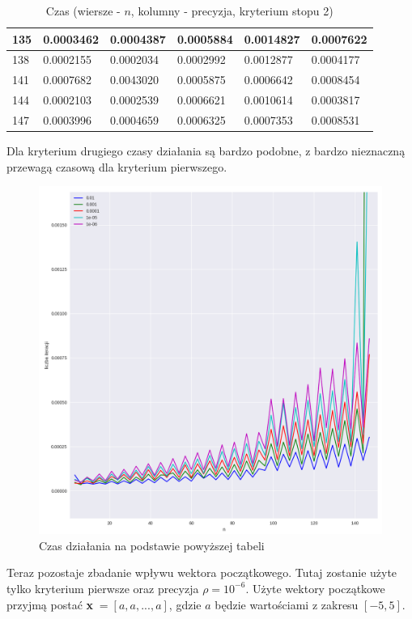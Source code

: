 \documentclass{article}
\begin{document}
\begin{table}[H]
\begin{tabular}{|l|l|l|l|l|l|}
135 & 0.0003462 & 0.0004387 & 0.0005884 & 0.0014827 & 0.0007622 \\ \hline
138 & 0.0002155 & 0.0002034 & 0.0002992 & 0.0012877 & 0.0004177 \\ \hline
141 & 0.0007682 & 0.0043020 & 0.0005875 & 0.0006642 & 0.0008454 \\ \hline
144 & 0.0002103 & 0.0002539 & 0.0006621 & 0.0010614 & 0.0003817 \\ \hline
147 & 0.0003996 & 0.0004659 & 0.0006325 & 0.0007353 & 0.0008531 \\ \hline
\end{tabular}
\caption{Czas (wiersze - $n$, kolumny - precyzja, kryterium stopu 2)}
\end{table}

Dla kryterium drugiego czasy działania są bardzo podobne, z bardzo nieznaczną przewagą czasową dla kryterium pierwszego.

\begin{figure}[H]
    \centering
    \includegraphics[width=\textwidth]{img/plot_6.png}
    \caption{Czas działania na podstawie powyższej tabeli}
\end{figure}

Teraz pozostaje zbadanie wpływu wektora początkowego. Tutaj zostanie użyte tylko kryterium pierwsze oraz precyzja $\rho=10^{-6}$. Użyte wektory
początkowe przyjmą postać \textbf{x}$\;=[a,a,...,a]$, gdzie $a$ będzie wartościami z zakresu $[-5,5]$.
\end{document}
